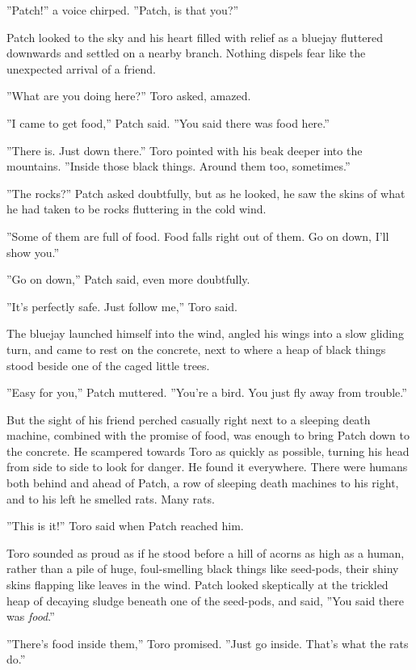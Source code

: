 \documentclass[12pt]{book}
\begin{document}
 ''Patch!'' a voice chirped. ''Patch, is that you?''\par
 Patch looked to the sky and his heart filled with relief as a bluejay fluttered downwards and settled on a nearby branch. Nothing dispels fear like the unexpected arrival of a friend.\par
 ''What are you doing here?'' Toro asked, amazed.\par
 ''I came to get food,'' Patch said. ''You said there was food here.''\par
 ''There is. Just down there.'' Toro pointed with his beak deeper into the mountains. ''Inside those black things. Around them too, sometimes.''\par
 ''The rocks?'' Patch asked doubtfully, but as he looked, he saw the skins of what he had taken to be rocks fluttering in the cold wind.\par
 ''Some of them are full of food. Food falls right out of them. Go on down, I'll show you.''\par
 ''Go on down,'' Patch said, even more doubtfully.\par
 ''It's perfectly safe. Just follow me,'' Toro said.\par
The bluejay launched himself into the wind, angled his wings into a slow gliding turn, and came to rest on the concrete, next to where a heap of black things stood beside one of the caged little trees.\par
 ''Easy for you,'' Patch muttered. ''You're a bird. You just fly away from trouble.''\par
But the sight of his friend perched casually right next to a sleeping death machine, combined with the promise of food, was enough to bring Patch down to the concrete. He scampered towards Toro as quickly as possible, turning his head from side to side to look for danger. He found it everywhere. There were humans both behind and ahead of Patch, a row of sleeping death machines to his right, and to his left he smelled rats. Many rats.\par
 ''This is it!'' Toro said when Patch reached him.\par
Toro sounded as proud as if he stood before a hill of acorns as high as a human, rather than a pile of huge, foul-smelling black things like seed-pods, their shiny skins flapping like leaves in the wind. Patch looked skeptically at the trickled heap of decaying sludge beneath one of the seed-pods, and said, ''You said there was {\it food}.''\par
 ''There's food inside them,'' Toro promised. ''Just go inside. That's what the rats do.''\par
\end{document}
